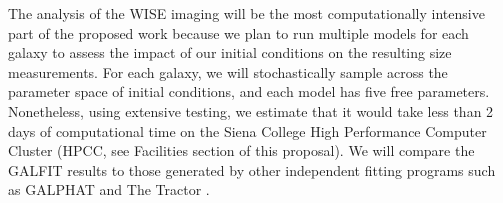 \documentclass[11pt, preprint]{aastex}
\newcommand{\sers}{{\it S\'{e}rsic}}
\begin{document}
{The analysis of the WISE imaging will be the most computationally
intensive part of the proposed work because we plan to run multiple
models for each galaxy to assess the impact of our initial conditions
on the resulting size measurements.  For each galaxy, we will
stochastically sample across the parameter space of initial
conditions, and each model has five free parameters.  Nonetheless,
using extensive testing, we estimate that it would take less than 2
days of computational time on the Siena College High Performance
Computer Cluster (HPCC, see Facilities section of this proposal).  We will compare the GALFIT results to those
generated by other independent fitting programs such as  GALPHAT \citep{yoon11} and The Tractor \citep{lang16}.



}
\end{document}
